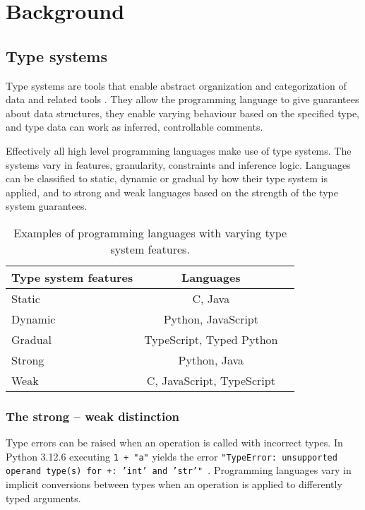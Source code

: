 \chapter{Background\label{background}}



\section{Type systems}

Type systems are tools that enable abstract organization and categorization of data and related tools \cite{programming_langs}. They allow the programming language to give guarantees about data structures, they enable varying behaviour based on the specified type, and type data can work as inferred, controllable comments.

Effectively all high level programming languages make use of type systems. The systems vary in features, granularity, constraints and inference logic. Languages can be classified to static, dynamic or gradual by how their type system is applied, and to strong and weak languages based on the strength of the type system guarantees.

\begin{table}[h!]
    \centering
    \begin{tabular}{@{}lcl@{}}
    \toprule
    Type system features       & Languages      \\ \midrule
    Static          & C,  Java           \\
    Dynamic         & Python, JavaScript \\ 
    Gradual         & TypeScript, Typed Python \\ \midrule
    Strong          & Python, Java \\
    Weak            & C, JavaScript, TypeScript  \\ \bottomrule
    \end{tabular}
    \caption{Examples of programming languages with varying type system features.}
    \label{table:1}
\end{table}

\subsection{The strong -- weak distinction}
Type errors can be raised when an operation is called with incorrect types. In Python 3.12.6 executing {\tt 1 + "a"} yields the error {\tt "TypeError: unsupported operand type(s) for +: 'int' and 'str'" }. Programming languages vary in implicit conversions between types when an operation is applied to differently typed arguments. 

